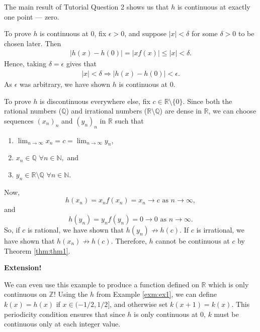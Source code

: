 \documentclass[
  17pt,
  a4paper]{extarticle}
\providecommand{\tightlist}{%
  \setlength{\itemsep}{0pt}\setlength{\parskip}{0pt}}
\theoremstyle{plain}
\theoremstyle{definition}
\theoremstyle{plain}
\theoremstyle{plain}
\theoremstyle{plain}
\theoremstyle{plain}
\theoremstyle{definition}
\theoremstyle{definition}
\theoremstyle{remark}
\theoremstyle{remark}
\let\BeginKnitrBlock\begin \let\EndKnitrBlock\end
\renewcommand{\;}{\,}
\begin{document}
\BeginKnitrBlock{solution*}
The main result of Tutorial Question 2 shows us that \(h\) is continuous at exactly one point --- zero.

To prove \(h\) is continuous at \(0\), fix \(\epsilon > 0\), and suppose \(\lvert x \rvert < \delta\) for some \(\delta > 0\) to be chosen later. Then
\begin{align*}
\lvert h(x) - h(0) \rvert = \lvert x f(x) \rvert \leq \lvert x \rvert < \delta.
\end{align*}
Hence, taking \(\delta = \epsilon\) gives that
\begin{align*}
\lvert x \rvert < \delta \Longrightarrow \lvert h(x) - h(0) \rvert < \epsilon.
\end{align*}
As \(\epsilon\) was arbitrary, we have shown \(h\) is continuous at \(0\).

To prove \(h\) is discontinuous everywhere else, fix \(c \in \mathbb{R}\setminus \lbrace 0 \rbrace.\) Since both the rational numbers (\(\mathbb{Q}\)) and irrational numbers (\(\mathbb{R}\setminus\mathbb{Q}\)) are dense in \(\mathbb{R}\), we can choose sequences \((x_n)_n\) and \((y_n)_n\) in \(\mathbb{R}\) such that

\begin{enumerate}
\def\labelenumi{\arabic{enumi}.}
\tightlist
\item
  \(\lim_{n \to \infty} x_n = c = \lim_{n \to \infty} y_n\),
\item
  \(x_n \in \mathbb{Q}\;\;\forall n \in \mathbb{N},\) and
\item
  \(y_n \in \mathbb{R}\setminus\mathbb{Q}\;\;\forall n \in \mathbb{N}.\)
\end{enumerate}

Now, \[h(x_n) = x_n f(x_n) = x_n \to c \;\;\text{as}\;\; n \to \infty,\] and \[h(y_n) = y_n f(y_n) = 0 \to 0 \;\;\text{as}\;\; n \to \infty.\] So, if \(c\) is rational, we have shown that \(h(y_n)\not\to h(c)\). If \(c\) is irrational, we have shown that \(h(x_n)\not\to h(c)\). Therefore, \(h\) cannot be continuous at \(c\) by Theorem \ref{thm:thm1}.
\EndKnitrBlock{solution*}

\textbf{Extension!}

\BeginKnitrBlock{example}
{\label{exm:ex2} }We can even use this example to produce a function defined on \(\mathbb{R}\) which is only continuous on \(\mathbb{Z}\)! Using the \(h\) from Example \ref{exm:ex1}, we can define \(k(x) = h(x)\) if \(x \in (-1/2, 1/2]\), and otherwise set \(k(x + 1) = k(x).\) This periodicity condition ensures that since \(h\) is only continuous at \(0\), \(k\) must be continuous only at each integer value.
\EndKnitrBlock{example}
\end{document}
